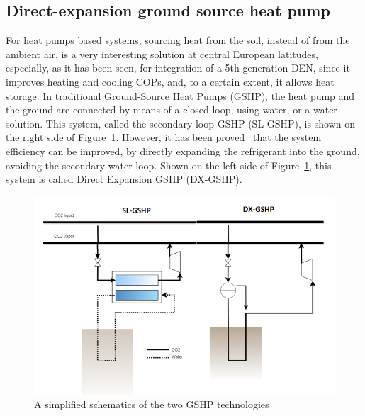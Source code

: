 \documentclass{article}
\begin{document}
\subsection{Direct-expansion ground source heat pump}\label{ss:dx}

For heat pumps based systems, sourcing heat from the soil, instead of from the ambient air, is a very interesting solution at central European latitudes, especially, as it has been seen, for integration of a 5th generation DEN, since it improves heating and cooling COPs, and, to a certain extent, it allows heat storage. In traditional Ground-Source Heat Pumps (GSHP), the heat pump and the ground are connected by means of a closed loop, using water, or a water solution. This system, called the secondary loop GSHP (SL-GSHP), is shown on the right side of Figure~\ref{fig:gshp}. However, it has been proved~\cite{kruseStatusDevelopmentResearch2010, guoTechnoeconomicComparisonDirect2012} that the system efficiency can be improved, by directly expanding the refrigerant into the ground, avoiding the secondary water loop. Shown on the left side of Figure~\ref{fig:gshp}, this system is called Direct Expansion GSHP (DX-GSHP). 

\begin{figure}[htp]
\centering
\includegraphics[width=1\textwidth]{CO2-DX}
\caption{A simplified schematics of the two GSHP technologies}
\label{fig:gshp}
\end{figure}
\end{document}
